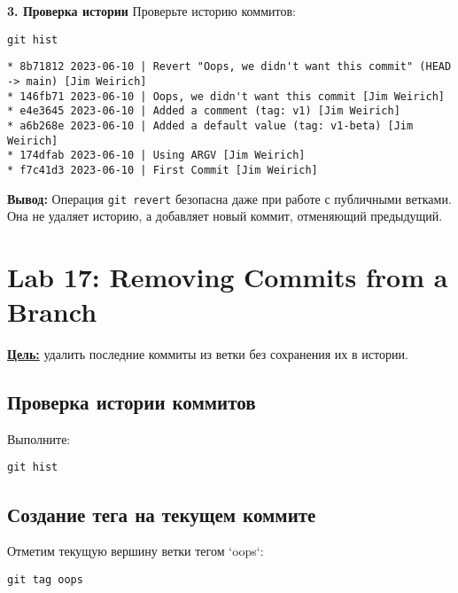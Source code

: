 \documentclass[a4paper,12pt]{report}
\begin{document}

\textbf{3. Проверка истории}
Проверьте историю коммитов:
\begin{verbatim}
git hist
\end{verbatim}

\begin{verbatim}
* 8b71812 2023-06-10 | Revert "Oops, we didn't want this commit" (HEAD -> main) [Jim Weirich]
* 146fb71 2023-06-10 | Oops, we didn't want this commit [Jim Weirich]
* e4e3645 2023-06-10 | Added a comment (tag: v1) [Jim Weirich]
* a6b268e 2023-06-10 | Added a default value (tag: v1-beta) [Jim Weirich]
* 174dfab 2023-06-10 | Using ARGV [Jim Weirich]
* f7c41d3 2023-06-10 | First Commit [Jim Weirich]
\end{verbatim}


\textbf{Вывод:} 
Операция \texttt{git revert} безопасна даже при работе с публичными ветками. Она не удаляет историю, а добавляет новый коммит, отменяющий предыдущий.

\section{Lab 17: Removing Commits from a Branch}
\textbf{\underline{Цель:}} удалить последние коммиты из ветки без сохранения их в истории.

\subsection*{Проверка истории коммитов}
Выполните:
\begin{verbatim}
git hist
\end{verbatim}


\subsection*{Создание тега на текущем коммите}
Отметим текущую вершину ветки тегом `oops`:
\begin{verbatim}
git tag oops
\end{verbatim}
\end{document}

